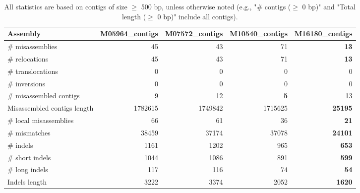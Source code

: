 \documentclass[12pt,a4paper]{article}
\begin{document}
\begin{table}[ht]
\begin{center}
\caption{All statistics are based on contigs of size $\geq$ 500 bp, unless otherwise noted (e.g., "\# contigs ($\geq$ 0 bp)" and "Total length ($\geq$ 0 bp)" include all contigs).}
\begin{tabular}{|l*{4}{|r}|}
\hline
Assembly & M05964\_contigs & M07572\_contigs & M10540\_contigs & M16180\_contigs \\ \hline
\# misassemblies & 45 & 43 & 71 & {\bf 13} \\ \hline
\hspace{5mm}\# relocations & 45 & 43 & 71 & {\bf 13} \\ \hline
\hspace{5mm}\# translocations & 0 & 0 & 0 & 0 \\ \hline
\hspace{5mm}\# inversions & 0 & 0 & 0 & 0 \\ \hline
\# misassembled contigs & 9 & 12 & {\bf 5} & 13 \\ \hline
Misassembled contigs length & 1782615 & 1749842 & 1715625 & {\bf 25195} \\ \hline
\# local misassemblies & 66 & 61 & 36 & {\bf 21} \\ \hline
\# mismatches & 38459 & 37174 & 37078 & {\bf 24101} \\ \hline
\# indels & 1161 & 1202 & 965 & {\bf 653} \\ \hline
\hspace{5mm}\# short indels & 1044 & 1086 & 891 & {\bf 599} \\ \hline
\hspace{5mm}\# long indels & 117 & 116 & 74 & {\bf 54} \\ \hline
Indels length & 3222 & 3374 & 2052 & {\bf 1620} \\ \hline
\end{tabular}
\end{center}
\end{table}
\end{document}
